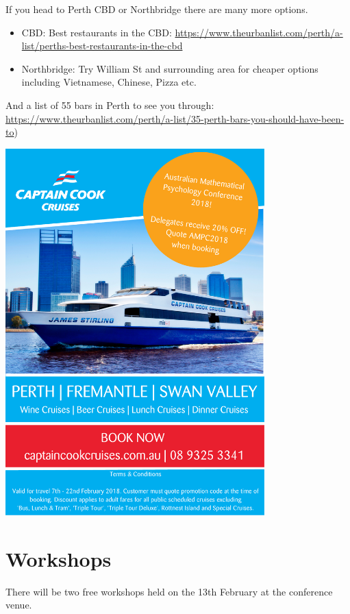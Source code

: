 \documentclass[]{article}
\providecommand{\tightlist}{%
  \setlength{\itemsep}{0pt}\setlength{\parskip}{0pt}}
\begin{document}
If you head to Perth CBD or Northbridge there are many more options.

\begin{itemize}
\tightlist
\item
  CBD: Best restaurants in the CBD:
  \url{https://www.theurbanlist.com/perth/a-list/perths-best-restaurants-in-the-cbd}
\item
  Northbridge: Try William St and surrounding area for cheaper options
  including Vietnamese, Chinese, Pizza etc.
\end{itemize}

And a list of 55 bars in Perth to see you through:
\url{https://www.theurbanlist.com/perth/a-list/35-perth-bars-you-should-have-been-to})

\begin{center}
\includegraphics[width=10cm]{images/CCC.pdf}
\end{center}

\pagebreak

\section{Workshops}\label{workshops}

There will be two free workshops held on the 13th February at the
conference venue.
\end{document}
